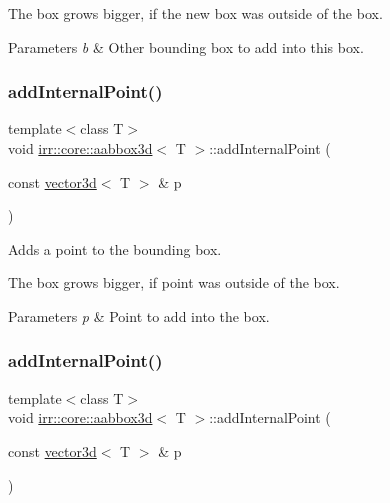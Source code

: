 The box grows bigger, if the new box was outside of the box. 
\begin{DoxyParams}{Parameters}
{\em b} & Other bounding box to add into this box. \\
\hline
\end{DoxyParams}
\mbox{\label{classirr_1_1core_1_1aabbox3d_a49e3765fd2f40a115f8f28bd74d62ccf}} 
\subsubsection{\texorpdfstring{add\+Internal\+Point()}{addInternalPoint()}\hspace{0.1cm}{\footnotesize\ttfamily [1/4]}}
{\footnotesize\ttfamily template$<$class T$>$ \\
void \hyperlink{classirr_1_1core_1_1aabbox3d}{irr\+::core\+::aabbox3d}$<$ T $>$\+::add\+Internal\+Point (\begin{DoxyParamCaption}\item[{const \hyperlink{classirr_1_1core_1_1vector3d}{vector3d}$<$ T $>$ \&}]{p }\end{DoxyParamCaption})\hspace{0.3cm}{\ttfamily [inline]}}



Adds a point to the bounding box. 

The box grows bigger, if point was outside of the box. 
\begin{DoxyParams}{Parameters}
{\em p} & Point to add into the box. \\
\hline
\end{DoxyParams}
\mbox{\label{classirr_1_1core_1_1aabbox3d_a49e3765fd2f40a115f8f28bd74d62ccf}} 
\subsubsection{\texorpdfstring{add\+Internal\+Point()}{addInternalPoint()}\hspace{0.1cm}{\footnotesize\ttfamily [2/4]}}
{\footnotesize\ttfamily template$<$class T$>$ \\
void \hyperlink{classirr_1_1core_1_1aabbox3d}{irr\+::core\+::aabbox3d}$<$ T $>$\+::add\+Internal\+Point (\begin{DoxyParamCaption}\item[{const \hyperlink{classirr_1_1core_1_1vector3d}{vector3d}$<$ T $>$ \&}]{p }\end{DoxyParamCaption})\hspace{0.3cm}{\ttfamily [inline]}}



